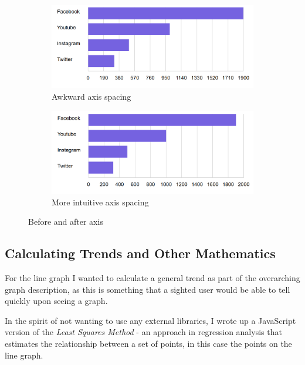 \documentclass[ %
                    author={Aleena Baig},
                supervisor={Dr Simon Lock},
                    degree={BSc},
                     title={On Making Web Accessible Graphs},
                  subtitle={},
                      year={2019} ]{dissertation}
\begin{document}
\begin{figure}[h]
  \centering
  \begin{subfigure}[b]{0.4\linewidth}
    \includegraphics[width=\linewidth]{images/awkwardAxis.PNG}
     \caption{Awkward axis spacing}
  \end{subfigure}
  \begin{subfigure}[b]{0.4\linewidth}
    \includegraphics[width=\linewidth]{images/lessAwkwardAxis.PNG}
    \caption{More intuitive axis spacing}
  \end{subfigure}
  \caption{Before and after axis}
  \label{fig:Awkwardsaxis}
\end{figure}

\subsection{Calculating Trends and Other Mathematics}

For the line graph I wanted to calculate a general trend as part of the overarching graph description, as this is something that a sighted user would be able to tell quickly upon seeing a graph.

In the spirit of not wanting to use any external libraries, I wrote up a JavaScript version of the \textit{Least Squares Method} -  an approach in regression analysis that estimates the relationship between a set of points, in this case the points on the line graph.
\end{document}
